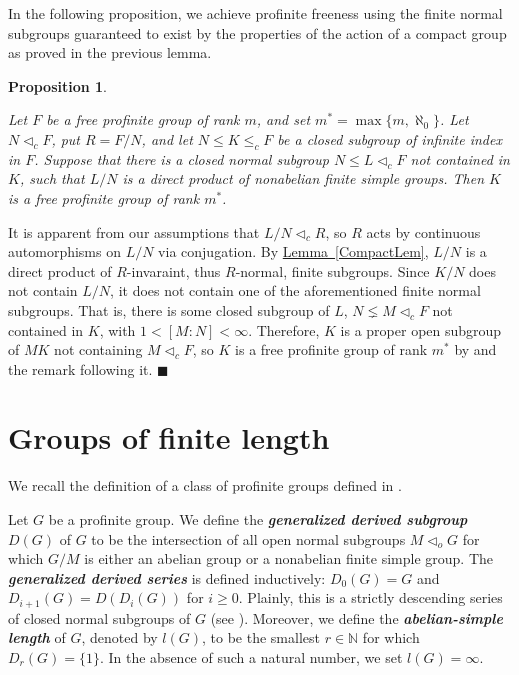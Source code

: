 \documentclass[12pt,a4paper]{article}
\newtheorem{proposition}[theorem]{Proposition}
\newenvironment{proof}[1][Proof]{\begin{trivlist}
\item[\hskip \labelsep {\bfseries #1}]}{\end{trivlist}}
\newenvironment{definition}[1][Definition]{\begin{trivlist}
\item[\hskip \labelsep {\bfseries #1}]}{\end{trivlist}}
\newcommand{\lemref}[1]{\hyperref[#1]{Lemma \ref*{#1}}}
\begin{document}
In the following proposition, we achieve profinite freeness using the finite normal subgroups guaranteed to exist by the properties of the action of a compact group as proved in the previous lemma.

\begin{proposition} \label{PushingUpProp}

Let $F$ be a free profinite group of rank $m$, and set $m^* = \max\{m,\aleph_0\}$. Let $N \lhd_c F$, put $R = F/N$, and let $N \leq K \leq_{c} F $ be a closed subgroup of infinite index in $F$. Suppose that there is a closed normal subgroup $N \leq L \lhd_c F$ not contained in $K$, such that $L/N$ is a direct product of nonabelian finite simple groups. Then $K$ is a free profinite group of rank $m^*$.

\end{proposition}


\begin{proof}

It is apparent from our assumptions that $L/N \lhd_c R$, so $R$ acts by continuous automorphisms on $L/N$ via conjugation. By \mbox{\lemref{CompactLem}}, $L/N$ is a direct product of $R$-invaraint, thus $R$-normal, finite subgroups. Since $K/N$ does not contain $L/N$, it does not contain one of the aforementioned finite normal subgroups. That is, there is some closed subgroup of $L$, $N \lneq M \lhd_c F$ not contained in $K$, with $1 < [M : N] < \infty$. Therefore, $K$ is a proper open subgroup of $MK$ not containing $M \lhd_c F$, so $K$ is a free profinite group of rank $m^*$ by \cite[Proposition 1.3]{Ja06} and the remark following it. $\blacksquare$

\end{proof}

\section{Groups of finite length}

We recall the definition of a class of profinite groups defined in \cite{BFW}.

\begin{definition}

Let $G$ be a profinite group. We define the \textbf{\textit{generalized derived subgroup}} $D(G)$ of $G$ to be the intersection of all open normal subgroups $M \lhd_o G$ for which $G/M$ is either an abelian group or a nonabelian finite simple group. The \textbf{\textit{generalized derived series}} is defined inductively: $D_0(G) = G$ and $D_{i+1}(G) = D(D_{i}(G))$ for $i \geq 0$. Plainly, this is a strictly descending series of closed normal subgroups of $G$ (see \cite[Lemma 2.1]{BFW}). Moreover, we define the \textbf{\textit{abelian-simple length}} of $G$, denoted by $l(G)$, to be the smallest $r \in \mathbb{N}$ for which $D_{r}(G) = \{1\}$. In the absence of such a natural number, we set $l(G) = \infty$. 

\end{definition} \label{FSLDef}
\end{document}
